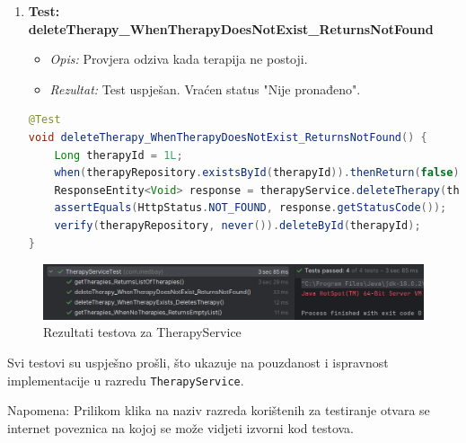 \begin{enumerate}
				\item \textbf{Test: deleteTherapy\_WhenTherapyDoesNotExist\_ReturnsNotFound}
				\begin{itemize}
					\item \textit{Opis:} Provjera odziva kada terapija ne postoji.
					\item \textit{Rezultat:} Test uspješan. Vraćen status "Nije pronađeno".
				\end{itemize}

\begin{lstlisting}[language=Java]
@Test
void deleteTherapy_WhenTherapyDoesNotExist_ReturnsNotFound() {
	Long therapyId = 1L;
	when(therapyRepository.existsById(therapyId)).thenReturn(false);
	ResponseEntity<Void> response = therapyService.deleteTherapy(therapyId);
	assertEquals(HttpStatus.NOT_FOUND, response.getStatusCode());
	verify(therapyRepository, never()).deleteById(therapyId);
}
\end{lstlisting}
					
			\end{enumerate}
			\begin{figure}[!h]
				\centering
				\includegraphics[width=1\linewidth]{slike/therapyServiceTest.png}
				\caption{Rezultati testova za TherapyService}
				\label{fig:enter-label}
			\end{figure}


			Svi testovi su uspješno prošli, što ukazuje na pouzdanost i ispravnost implementacije u razredu \texttt{TherapyService}. \newline

			Napomena: Prilikom klika na naziv razreda korištenih za testiranje otvara se internet poveznica na kojoj se može vidjeti izvorni kod testova.

			
			

